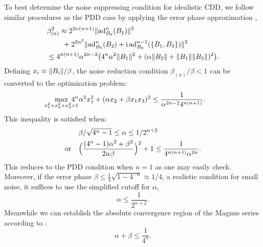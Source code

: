 \documentclass[aps,pra,reprint,superscriptaddress]{revtex4-2}
\begin{document}
To best determine the noise suppressing condition for idealistic CDD, we follow  similar procedures as the PDD case by applying the error phase approximation ,
\begin{align}
&\beta_{(n)}^2 \approx 2^{2n(n+1)}\norm{\ad_{B_0}^{n}(B_1)}^2 \notag \\
&\phantom{\beta_{n}^2 \approx} + 2^{2n^2} \norm{  \ad_{B_0}^{n}(B_2)+ \upi \ad_{B_0}^{n-1}(\{B_1,B_3\})}^2 \notag \\
&\le 4^{n(n+1)} \alpha^{2n-2} 
    \bigl( 4^n \alpha^{2} \norm{B_1}^2 +   ( \alpha \norm{B_2}+  \norm{B_1}\norm{B_3})^2 \bigr).
\end{align}
Defining $x_i\equiv\Vert {B_i} \Vert/\beta$,
the noise reduction condition $\beta_{(n)}/\beta<1$ can be converted to the optimization problem:
\begin{equation}
\begin{split}
& \max_{\mathclap{ x_1^2+x_2^2+x_3^2=1 }} \; 4^n \alpha^{2} x_1^2 +  ( \alpha  x_2+ \beta x_1 x_3)^2\le 
\frac{1}{\alpha^{2n-2}  4^{n(n+1)}}.
\end{split}
\end{equation}
This inequality is satisfied when:
\begin{equation}
\begin{aligned}\label{eq:CDD-noise-removal}
& {\beta}/{\sqrt{4^n-1}} \le \alpha \le 1/2^{n+2} \ \\
\mathrm{or}\quad  &\Bigl(\dfrac{(4^n-1) \alpha^2 +\beta^2}{2\alpha\beta}\Bigr)^2+1  \le
\frac{1}{4^{n(n+1)}\alpha^{2n}}. 
\end{aligned}   
\end{equation}
This reduces to the PDD condition  when $n=1$ as one may easily check. Moreover, if the error phase $\beta\le\frac{1}{4} \sqrt{1-4^{-n}}\approx  1/4$, a realistic condition for small noise, it suffices to use the simplified cutoff for $\alpha$, 
\begin{equation}\label{eq:CDD-bound-simplified}
    \alpha \le \frac{1}{2^{n+2}}.
\end{equation}
Meanwhile we can establish the absolute convergence region of the Magnus series according to :
\begin{equation}\label{eq:CDD-converge}
    \alpha +\beta \le \frac{1}{4^n}.
\end{equation}
\end{document}
